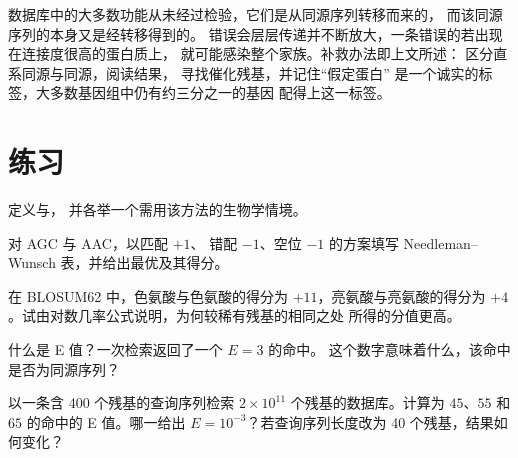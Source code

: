 \begin{remark}[推断的局限]\label{rem:b3:bioinformatics:limits}
数据库中的大多数功能从未经过检验，它们是从同源序列转移而来的，
而该同源序列的本身又是经转移得到的。
错误会层层传递并不断放大，一条错误的若出现在连接度很高的蛋白质上，
就可能感染整个家族。补救办法即上文所述：
区分直系同源与同源，阅读结果，
寻找催化残基，并记住“假定蛋白”
是一个诚实的标签，大多数基因组中仍有约三分之一的基因
配得上这一标签。
\end{remark}

\section{练习}

\begin{exercise}[$\star$]\label{exo:b3:bioinformatics:1}
定义与，
并各举一个需用该方法的生物学情境。
\end{exercise}

\begin{exercise}[$\star$]\label{exo:b3:bioinformatics:2}
对 AGC 与 AAC，以匹配 $+1$、
错配 $-1$、空位 $-1$ 的方案填写 Needleman--Wunsch 表，并给出最优及其得分。
\end{exercise}

\begin{exercise}[$\star$]\label{exo:b3:bioinformatics:3}
在 BLOSUM62 中，色氨酸与色氨酸的得分为 $+11$，亮氨酸与亮氨酸的得分为
$+4$。试由对数几率公式说明，为何较稀有残基的相同之处
所得的分值更高。
\end{exercise}

\begin{exercise}[$\star$]\label{exo:b3:bioinformatics:4}
什么是 E 值？一次检索返回了一个 $E = 3$ 的命中。
这个数字意味着什么，该命中是否为同源序列？
\end{exercise}

\begin{exercise}[$\star\star$]\label{exo:b3:bioinformatics:5}
以一条含 \num{400} 个残基的查询序列检索 $2\times 10^{11}$
个残基的数据库。计算为 $45$、$55$ 和
$65$ 的命中的 E 值。哪一给出 $E = 10^{-3}$？若查询序列长度改为
\num{40} 个残基，结果如何变化？
\end{exercise}

